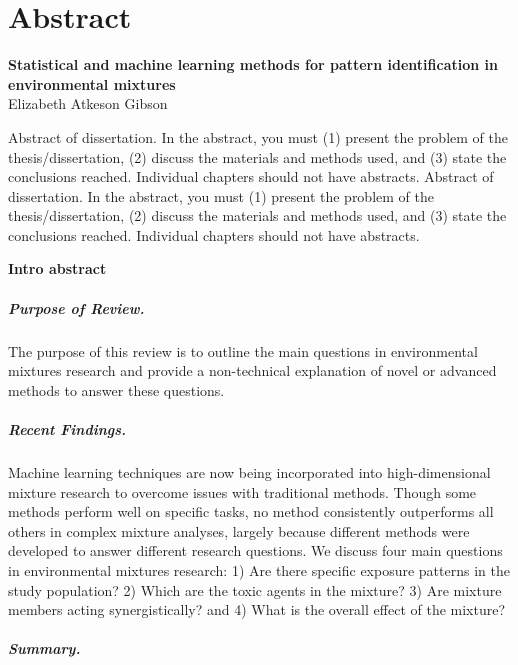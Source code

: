 \chapter*{Abstract}
\vspace{-2.5em}
\begin{center}
    \large \textbf{Statistical and machine learning methods for pattern identification in environmental mixtures} \\
    Elizabeth Atkeson Gibson \\
\end{center}
\thispagestyle{empty}

Abstract of dissertation. In the abstract, you must (1) present the problem of the thesis/dissertation, (2) discuss the materials and methods used, and (3) state the conclusions reached. Individual chapters should not have abstracts.	Abstract of dissertation. In the abstract, you must (1) present the problem of the thesis/dissertation, (2) discuss the materials and methods used, and (3) state the conclusions reached. Individual chapters should not have abstracts.
	
\textbf{Intro abstract}
\paragraph{Purpose of Review.}

The purpose of this review is to outline the main questions in environmental mixtures research and provide a non-technical explanation of novel or advanced methods to answer these questions.

\paragraph{Recent Findings.} 

Machine learning techniques are now being incorporated into high-dimensional mixture research to overcome issues with traditional methods. Though some methods perform well on specific tasks, no method consistently outperforms all others in complex mixture analyses, largely because different methods were developed to answer different research questions. We discuss four main questions in environmental mixtures research: 1) Are there specific exposure patterns in the study population? 2) Which are the toxic agents in the mixture? 3) Are mixture members acting synergistically? and 4) What is the overall effect of the mixture? 

\paragraph{Summary.} 

